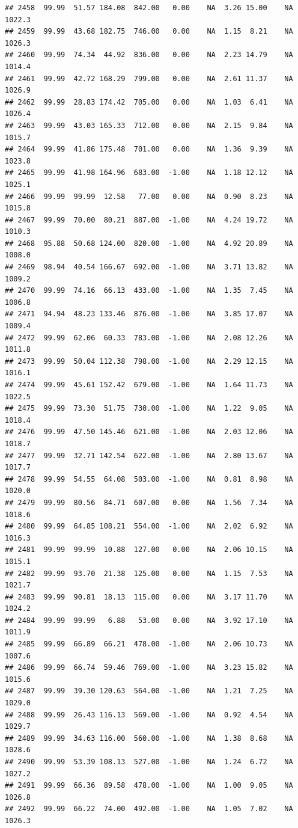 \documentclass{article}\usepackage{graphicx, color}
\makeatletter
\newenvironment{kframe}{%
 \def\at@end@of@kframe{}%
 \ifinner\ifhmode%
  \def\at@end@of@kframe{\end{minipage}}%
  \begin{minipage}{\columnwidth}%
 \fi\fi%
 \def\FrameCommand##1{\hskip\@totalleftmargin \hskip-\fboxsep
 \colorbox{shadecolor}{##1}\hskip-\fboxsep
     \hskip-\linewidth \hskip-\@totalleftmargin \hskip\columnwidth}%
 \MakeFramed {\advance\hsize-\width
   \@totalleftmargin\z@ \linewidth\hsize
   \@setminipage}}%
 {\par\unskip\endMakeFramed%
 \at@end@of@kframe}
\newenvironment{knitrout}{}{} %
\makeatother
\begin{document}
\begin{knitrout}
\begin{kframe}
\begin{verbatim}
## 2458  99.99  51.57 184.08  842.00   0.00    NA  3.26 15.00    NA 1022.3
## 2459  99.99  43.68 182.75  746.00   0.00    NA  1.15  8.21    NA 1026.3
## 2460  99.99  74.34  44.92  836.00   0.00    NA  2.23 14.79    NA 1014.4
## 2461  99.99  42.72 168.29  799.00   0.00    NA  2.61 11.37    NA 1026.9
## 2462  99.99  28.83 174.42  705.00   0.00    NA  1.03  6.41    NA 1026.4
## 2463  99.99  43.03 165.33  712.00   0.00    NA  2.15  9.84    NA 1015.7
## 2464  99.99  41.86 175.48  701.00   0.00    NA  1.36  9.39    NA 1023.8
## 2465  99.99  41.98 164.96  683.00  -1.00    NA  1.18 12.12    NA 1025.1
## 2466  99.99  99.99  12.58   77.00   0.00    NA  0.90  8.23    NA 1015.8
## 2467  99.99  70.00  80.21  887.00  -1.00    NA  4.24 19.72    NA 1010.3
## 2468  95.88  50.68 124.00  820.00  -1.00    NA  4.92 20.89    NA 1008.0
## 2469  98.94  40.54 166.67  692.00  -1.00    NA  3.71 13.82    NA 1009.2
## 2470  99.99  74.16  66.13  433.00  -1.00    NA  1.35  7.45    NA 1006.8
## 2471  94.94  48.23 133.46  876.00  -1.00    NA  3.85 17.07    NA 1009.4
## 2472  99.99  62.06  60.33  783.00  -1.00    NA  2.08 12.26    NA 1011.8
## 2473  99.99  50.04 112.38  798.00  -1.00    NA  2.29 12.15    NA 1016.1
## 2474  99.99  45.61 152.42  679.00  -1.00    NA  1.64 11.73    NA 1022.5
## 2475  99.99  73.30  51.75  730.00  -1.00    NA  1.22  9.05    NA 1018.4
## 2476  99.99  47.50 145.46  621.00  -1.00    NA  2.03 12.06    NA 1018.7
## 2477  99.99  32.71 142.54  622.00  -1.00    NA  2.80 13.67    NA 1017.7
## 2478  99.99  54.55  64.08  503.00  -1.00    NA  0.81  8.98    NA 1020.0
## 2479  99.99  80.56  84.71  607.00   0.00    NA  1.56  7.34    NA 1018.6
## 2480  99.99  64.85 108.21  554.00  -1.00    NA  2.02  6.92    NA 1016.3
## 2481  99.99  99.99  10.88  127.00   0.00    NA  2.06 10.15    NA 1015.1
## 2482  99.99  93.70  21.38  125.00   0.00    NA  1.15  7.53    NA 1021.7
## 2483  99.99  90.81  18.13  115.00   0.00    NA  3.17 11.70    NA 1024.2
## 2484  99.99  99.99   6.88   53.00   0.00    NA  3.92 17.10    NA 1011.9
## 2485  99.99  66.89  66.21  478.00  -1.00    NA  2.06 10.73    NA 1007.6
## 2486  99.99  66.74  59.46  769.00  -1.00    NA  3.23 15.82    NA 1015.6
## 2487  99.99  39.30 120.63  564.00  -1.00    NA  1.21  7.25    NA 1029.0
## 2488  99.99  26.43 116.13  569.00  -1.00    NA  0.92  4.54    NA 1029.7
## 2489  99.99  34.63 116.00  560.00  -1.00    NA  1.38  8.68    NA 1028.6
## 2490  99.99  53.39 108.13  527.00  -1.00    NA  1.24  6.72    NA 1027.2
## 2491  99.99  66.36  89.58  478.00  -1.00    NA  1.00  9.05    NA 1026.8
## 2492  99.99  66.22  74.00  492.00  -1.00    NA  1.05  7.02    NA 1026.3

\end{verbatim}
\end{kframe}
\end{knitrout}
\end{document}
